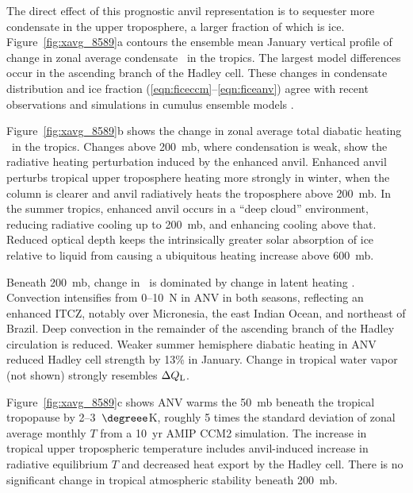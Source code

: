 \documentclass[twocolumn,twoside,final,10pt]{article}
\begin{document}
The direct effect of this prognostic anvil representation is to
sequester more condensate in the upper troposphere, a larger fraction
of which is ice.
Figure~\ref{fig:xavg_8589}a contours the ensemble mean January
vertical profile of change in zonal average condensate \qc\ in 
the tropics.  
The largest model differences occur in the ascending branch of
the Hadley cell.
These changes in condensate distribution and ice fraction
(\ref{eqn:ficeccm}--\ref{eqn:ficeanv}) agree with 
recent observations \cite[]{WSS931,GrM96} and simulations in cumulus 
ensemble models \cite[]{SLT94,GMK95}. 

Figure~\ref{fig:xavg_8589}b shows the change in zonal average total
diabatic heating \QT\ in the tropics.
Changes above 200~mb, where condensation is weak, show the radiative
heating perturbation induced by the enhanced anvil.
Enhanced anvil perturbs tropical upper troposphere heating more
strongly in winter, when the column is clearer and anvil radiatively
heats the troposphere above 200~mb.  
In the summer tropics, enhanced anvil occurs in a ``deep cloud''
environment, reducing radiative cooling up to 200~mb, and enhancing
cooling above that. 
Reduced optical depth keeps the intrinsically greater solar absorption
of ice relative to liquid from causing a ubiquitous heating increase
above 600~mb.

Beneath 200~mb, change in \QT\ is dominated by change in latent
heating \QL. 
Convection intensifies from 0--10~\degreee N in ANV in both seasons,
reflecting an enhanced ITCZ, notably over Micronesia, the east
Indian Ocean, and northeast of Brazil. 
Deep convection in the remainder of the ascending branch of the Hadley
circulation is reduced. 
Weaker summer hemisphere diabatic heating in ANV reduced Hadley cell
strength by 13\% in January.
Change in tropical water vapor (not shown) strongly resembles $\Delta
\mbox{$Q_\mathrm{L}$}$.

Figure~\ref{fig:xavg_8589}c shows ANV warms the 50~mb beneath the
tropical tropopause by 2--3~$\degreee$K, roughly 5 times the standard
deviation of  zonal average monthly $T$ from a 10~yr AMIP CCM2
simulation. 
The increase in tropical upper tropospheric temperature includes
anvil-induced increase in radiative equilibrium $T$ and decreased heat
export by the Hadley cell.
There is no significant change in tropical atmospheric stability
beneath 200~mb. 
\end{document}
